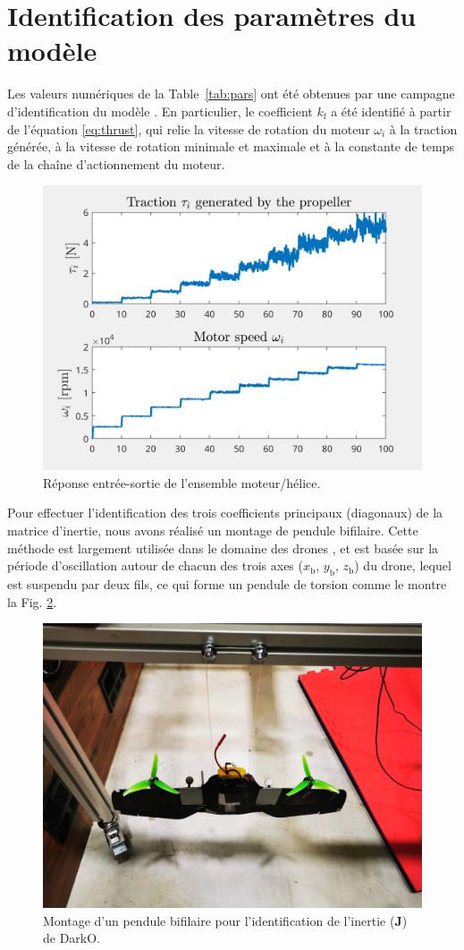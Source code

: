 \section{Identification des paramètres du modèle}
    Les valeurs numériques de la Table~\ref{tab:pars} ont été obtenues par une campagne d'identification du modèle \cite{sansouStage}. En particulier, le coefficient $k_{\text{f}}$ a été identifié à partir de l'équation \eqref{eq:thrust}, qui relie la vitesse de rotation du moteur $\omega_{i}$ à la traction générée, à la vitesse de rotation minimale et maximale et à la constante de temps de la chaîne d'actionnement du moteur.
    \begin{figure}[ht!]
        \centerline{
        \includegraphics[trim=0cm 0cm 0cm 0cm,clip,width=0.5\columnwidth]{figures/ident_motor March 27 2024 1651.png}}
        \caption{Réponse entrée-sortie de l'ensemble moteur/hélice.}
        \label{fig:IOmot}
    \end{figure}
    
    Pour effectuer l'identification des trois coefficients principaux (diagonaux) de la matrice d'inertie, nous avons réalisé un montage de pendule bifilaire. Cette méthode est largement utilisée dans le domaine des drones \cite{Jardin2007OptimizedMO}, et est basée sur la période d'oscillation autour de chacun des trois axes ($x_{{\text{b}}}$, $y_{\text{b}}$, $z_{\text{b}}$) du drone, lequel est suspendu par deux fils, ce qui forme un pendule de torsion comme le montre la Fig. \ref{fig:BifilarPend}.

    \begin{figure}[ht!]
        \centerline{
        \includegraphics[trim=20cm 15cm 23cm 0cm,clip,width=0.3\columnwidth]{figures/IMG_20230609_085023.jpg}}
        \caption{Montage d'un pendule bifilaire pour l'identification de l'inertie ($\boldsymbol{J}$) de DarkO.}
        \label{fig:BifilarPend}
    \end{figure}

